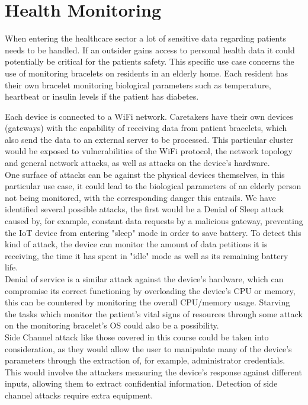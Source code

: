 \section{Health Monitoring} \label{chapter:use_case_1}
When entering the healthcare sector a lot of sensitive data regarding patients needs to be handled. If an outsider gains access to personal health data it could potentially be critical for the patients safety. This specific use case concerns the use of monitoring bracelets on residents in an elderly home. Each resident has their own bracelet monitoring biological parameters such as temperature, heartbeat or insulin levels if the patient has diabetes. 

Each device is connected to a WiFi network. Caretakers have their own devices (gateways) with the capability of receiving data from patient bracelets, which also send the data to an external server to be processed. This particular cluster would be exposed to vulnerabilities of the WiFi protocol, the network topology and general network attacks, as well as attacks on the device's hardware.\\

One surface of attacks can be against the physical devices themselves, in this particular use case, it could lead to the biological parameters of an elderly person not being monitored, with the corresponding danger this entrails. We have identified several possible attacks, the first would be a Denial of Sleep attack caused by, for example, constant data requests by a malicious gateway, preventing the IoT device from entering "sleep" mode in order to save battery. To detect this kind of attack, the device can monitor the amount of data petitions it is receiving, the time it has spent in "idle" mode as well as its remaining battery life. \\ 

Denial of service is a similar attack against the device's hardware, which can compromise its correct functioning by overloading the device's CPU or memory, this can be countered by monitoring the overall CPU/memory usage. Starving the tasks which monitor the patient's vital signs of resources through some attack on the monitoring bracelet's OS could also be a possibility.\\

Side Channel attack like those covered in this course could be taken into consideration, as they would allow the user to manipulate many of the device's parameters through the extraction of, for example, administrator credentials. This would involve the attackers measuring the device's response against different inputs, allowing them to extract confidential information. Detection of side channel attacks require extra equipment.\\

